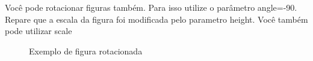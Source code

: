 \documentclass[	DIV=calc,%
							paper=a4,%
							fontsize=12pt,%
							onecolumn]{scrartcl}	 					%
\begin{document}
Você pode rotacionar figuras também. Para isso utilize o parâmetro angle=-90. Repare que a escala da figura foi modificada pelo parametro height. Você também pode utilizar scale

\begin{figure}
	\centering
	\caption{Exemplo de figura rotacionada}
	\label{fig3}
\end{figure}


\end{document}
